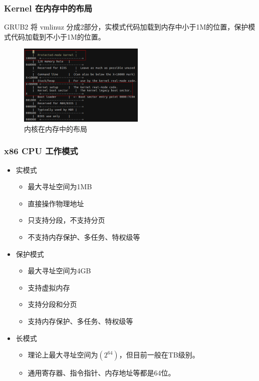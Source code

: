 \documentclass{beamer}
\begin{document}
\begin{frame}[fragile]
    \frametitle{Kernel 在内存中的布局}

    GRUB2 将 vmlinuz 分成2部分，实模式代码加载到内存中小于1M的位置，保护模式代码加载到不小于1M的位置。

    \begin{figure}[htbp]
    \centering
    \includegraphics[width=6cm]{images/kernel_memory_layout.png}
    \caption{内核在内存中的布局}
    \end{figure}

\end{frame}

\begin{frame}
    \frametitle{x86 CPU 工作模式}

    \begin{itemize}
        \item 实模式
            \begin{itemize}
                \item 最大寻址空间为1MB
                \item 直接操作物理地址
                \item 只支持分段，不支持分页
                \item 不支持内存保护、多任务、特权级等
            \end{itemize}
        \item 保护模式
            \begin{itemize}
                \item 最大寻址空间为4GB
                \item 支持虚拟内存
                \item 支持分段和分页
                \item 支持内存保护、多任务、特权级等
            \end{itemize}
        \item 长模式
            \begin{itemize}
                \item 理论上最大寻址空间为$(2^{64})$，但目前一般在TB级别。
                \item 通用寄存器、指令指针、内存地址等都是64位。
            \end{itemize}
    \end{itemize}
\end{frame}
\end{document}
